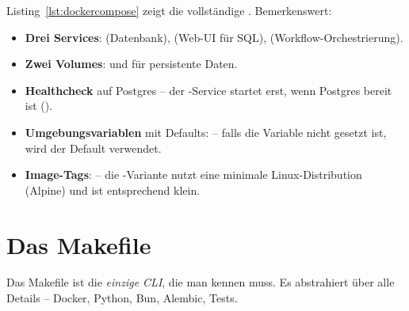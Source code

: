 Listing~\ref{lst:dockercompose} zeigt die vollständige
. Bemerkenswert:

\begin{itemize}
  \item \textbf{Drei Services}:  (Datenbank),
         (Web-UI für SQL), 
        (Workflow-Orchestrierung).
  \item \textbf{Zwei Volumes}:  und
         für persistente Daten.
  \item \textbf{Healthcheck} auf Postgres -- der -Service
        startet erst, wenn Postgres bereit ist ().
  \item \textbf{Umgebungsvariablen} mit Defaults:
         -- falls die Variable
        nicht gesetzt ist, wird der Default  verwendet.
  \item \textbf{Image-Tags}:  -- die
        -Variante nutzt eine minimale Linux-Distribution
        (Alpine) und ist entsprechend klein.
\end{itemize}

\section{Das Makefile}

Das Makefile ist die \emph{einzige CLI}, die man kennen muss. Es
abstrahiert über alle Details -- Docker, Python, Bun, Alembic,
Tests.

